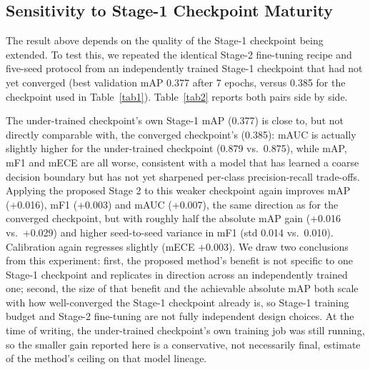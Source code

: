 \documentclass[conference]{IEEEtran}
\begin{document}
\subsection{Sensitivity to Stage-1 Checkpoint Maturity}
The result above depends on the quality of the Stage-1 checkpoint being extended. To test this, we repeated the identical Stage-2 fine-tuning recipe and five-seed protocol from an independently trained Stage-1 checkpoint that had not yet converged (best validation mAP 0.377 after 7 epochs, versus 0.385 for the checkpoint used in Table~\ref{tab1}). Table~\ref{tab2} reports both pairs side by side.

\begin{table}[htbp]
\caption{Stage-2 (proposed) applied to two independently trained Stage-1 checkpoints of different maturity. Stage-2 rows are mean $\pm$ sample standard deviation over the same 5 seeds used in Table~\ref{tab1}.}
\begin{center}
\label{tab2}
\end{center}
\end{table}

The under-trained checkpoint's own Stage-1 mAP (0.377) is close to, but not directly comparable with, the converged checkpoint's (0.385): mAUC is actually slightly higher for the under-trained checkpoint (0.879 vs.\ 0.875), while mAP, mF1 and mECE are all worse, consistent with a model that has learned a coarse decision boundary but has not yet sharpened per-class precision-recall trade-offs. Applying the proposed Stage 2 to this weaker checkpoint again improves mAP (+0.016), mF1 (+0.003) and mAUC (+0.007), the same direction as for the converged checkpoint, but with roughly half the absolute mAP gain (+0.016 vs.\ +0.029) and higher seed-to-seed variance in mF1 (std 0.014 vs.\ 0.010). Calibration again regresses slightly (mECE +0.003). We draw two conclusions from this experiment: first, the proposed method's benefit is not specific to one Stage-1 checkpoint and replicates in direction across an independently trained one; second, the size of that benefit and the achievable absolute mAP both scale with how well-converged the Stage-1 checkpoint already is, so Stage-1 training budget and Stage-2 fine-tuning are not fully independent design choices. At the time of writing, the under-trained checkpoint's own training job was still running, so the smaller gain reported here is a conservative, not necessarily final, estimate of the method's ceiling on that model lineage.
\end{document}
